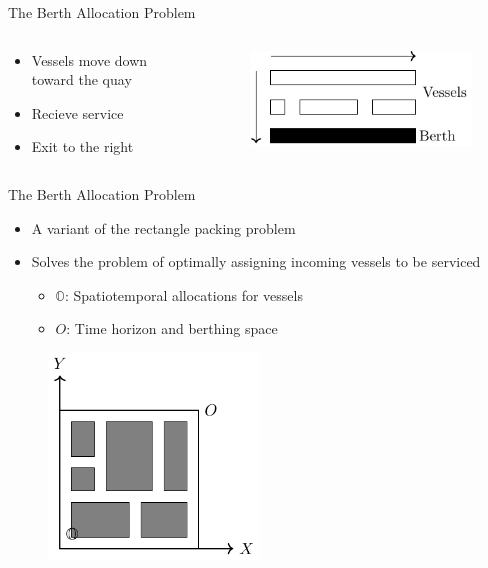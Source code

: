 \documentclass[bigger]{beamer}
\begin{document}
\begin{frame}[label={sec:orgd64a9b0}]{The Berth Allocation Problem}
\begin{columns}
\begin{column}{0.5\columnwidth}
\begin{itemize}
\item Vessels move down toward the quay
\item Recieve service
\item Exit to the right
\end{itemize}
\end{column}

\begin{column}{0.5\columnwidth}
\begin{figure}[htpb]
\centering
    \includegraphics{img/bap}
    \label{subfig:bapexample}
\end{figure}
\end{column}
\end{columns}
\end{frame}

\begin{frame}[label={sec:org57b447f}]{The Berth Allocation Problem}
\begin{itemize}
\item A variant of the rectangle packing problem
\item Solves the problem of optimally assigning incoming vessels to be serviced
\begin{itemize}
\item \(\mathbb{O}\): Spatiotemporal allocations for vessels
\item \(O\): Time horizon and berthing space
\end{itemize}
\end{itemize}


\begin{figure}[htpb]
\centering
    \includegraphics[width=0.5\textwidth]{img/spatiotemporal-packing}
\end{figure}
\end{frame}
\end{document}
